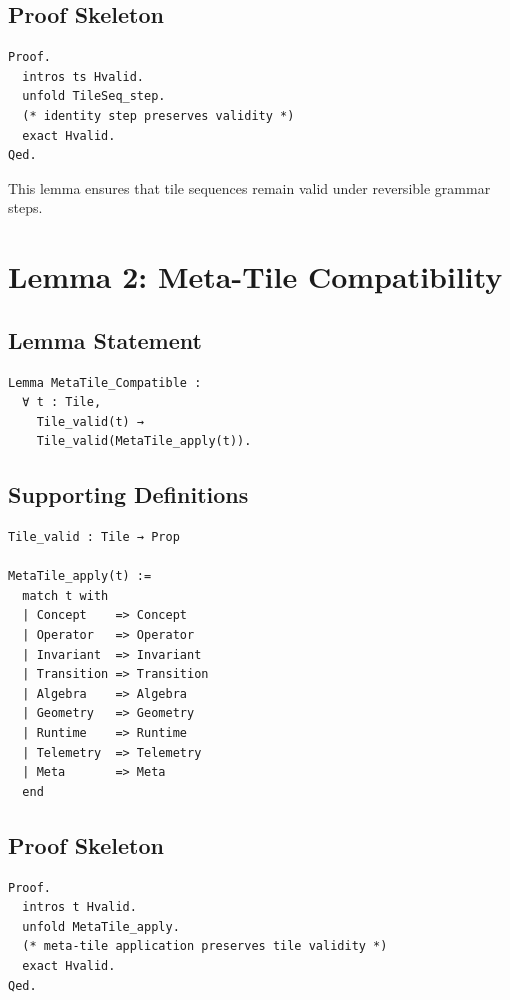 \documentclass[11pt]{article}
\begin{document}
\subsection{Proof Skeleton}

\begin{verbatim}
Proof.
  intros ts Hvalid.
  unfold TileSeq_step.
  (* identity step preserves validity *)
  exact Hvalid.
Qed.
\end{verbatim}

This lemma ensures that tile sequences remain valid under reversible grammar
steps.

\newpage


\section{Lemma 2: Meta-Tile Compatibility}

\subsection{Lemma Statement}

\begin{verbatim}
Lemma MetaTile_Compatible :
  ∀ t : Tile,
    Tile_valid(t) →
    Tile_valid(MetaTile_apply(t)).
\end{verbatim}

\subsection{Supporting Definitions}

\begin{verbatim}
Tile_valid : Tile → Prop

MetaTile_apply(t) :=
  match t with
  | Concept    => Concept
  | Operator   => Operator
  | Invariant  => Invariant
  | Transition => Transition
  | Algebra    => Algebra
  | Geometry   => Geometry
  | Runtime    => Runtime
  | Telemetry  => Telemetry
  | Meta       => Meta
  end
\end{verbatim}

\subsection{Proof Skeleton}

\begin{verbatim}
Proof.
  intros t Hvalid.
  unfold MetaTile_apply.
  (* meta-tile application preserves tile validity *)
  exact Hvalid.
Qed.
\end{verbatim}
\end{document}
